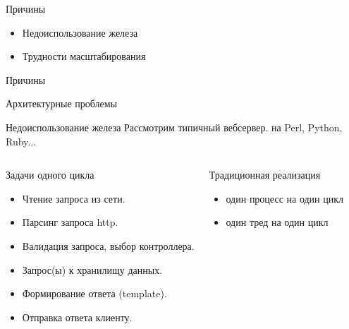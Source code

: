 \documentclass[aspectratio=169]{beamer}
\begin{document}
\begin{frame}{Причины}
    \begin{itemize}
        \pause
        \item Недоиспользование железа

        \pause
        \item Трудности масштабирования
    \end{itemize}

\end{frame}

\begin{frame}{Причины}
    \begin{block}
        {\huge Архитектурные проблемы}
    \end{block}
\end{frame}

\begin{frame}{Недоиспользование железа}
    Рассмотрим типичный вебсервер.
    \pause на Perl\pause, Python\pause, Ruby\pause...

    \begin{columns}
        \begin{block}{Задачи одного цикла}
            \begin{itemize}
                \pause
                \item Чтение запроса из сети.

                \pause
                \item Парсинг запроса http.

                \pause
                \item Валидация запроса, выбор контроллера.

                \pause
                \item Запрос(ы) к хранилищу данных.

                \pause
                \item Формирование ответа (template).

                \pause
                \item Отправка ответа клиенту.
            \end{itemize}
        \end{block}

        \pause
        \begin{block}{Традиционная реализация}
            \begin{itemize}
                \pause
                \item один процесс на один цикл
                
                \pause
                \item один тред на один цикл
            \end{itemize}

        \end{block}
    \end{columns}
\end{frame}
\end{document}
